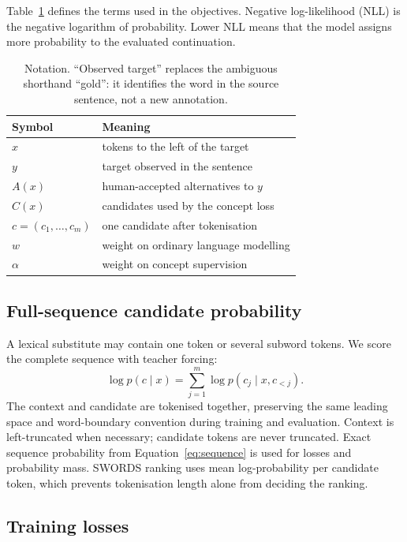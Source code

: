 \documentclass[11pt]{article}
\begin{document}
Table~\ref{tab:notation} defines the terms used in the objectives. Negative
log-likelihood (NLL) is the negative logarithm of probability. Lower NLL means
that the model assigns more probability to the evaluated continuation.

\begin{table}[t]
\centering\footnotesize\setlength{\tabcolsep}{3pt}
\begin{tabular}{ll}
\toprule
Symbol & Meaning \\
\midrule
$x$ & tokens to the left of the target \\
$y$ & target observed in the sentence \\
$A(x)$ & human-accepted alternatives to $y$ \\
$C(x)$ & candidates used by the concept loss \\
$c=(c_1,\ldots,c_m)$ & one candidate after tokenisation \\
$w$ & weight on ordinary language modelling \\
$\alpha$ & weight on concept supervision \\
\bottomrule
\end{tabular}
\caption{Notation. ``Observed target'' replaces the ambiguous shorthand
``gold'': it identifies the word in the source sentence, not a new annotation.}
\label{tab:notation}
\end{table}

\subsection{Full-sequence candidate probability}

A lexical substitute may contain one token or several subword tokens. We score
the complete sequence with teacher forcing:
\begin{equation}
\log p(c\mid x)=\sum_{j=1}^{m}\log p(c_j\mid x,c_{<j}).
\label{eq:sequence}
\end{equation}
The context and candidate are tokenised together, preserving the same leading
space and word-boundary convention during training and evaluation. Context is
left-truncated when necessary; candidate tokens are never truncated. Exact
sequence probability from Equation~\ref{eq:sequence} is used for losses and
probability mass. SWORDS ranking uses mean log-probability per candidate token,
which prevents tokenisation length alone from deciding the ranking.

\subsection{Training losses}
\end{document}
